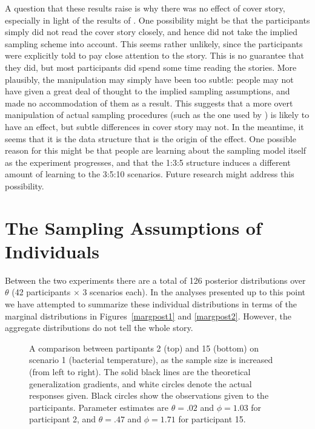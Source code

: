 \documentclass[doc]{apa6}
\begin{document}
A question that these results raise is why there was no effect of cover story, especially in light of the results of . One possibility might be that the participants simply did not read the cover story closely, and hence did not take the implied sampling scheme into account. This seems rather unlikely, since the participants were explicitly told to pay close attention to the story. This is no guarantee that they did, but most participants did spend some time reading the stories. More plausibly, the manipulation may simply have been too subtle: people may not have given a great deal of thought to the implied sampling assumptions, and made no accommodation of them as a result. This suggests that a more overt manipulation of actual sampling procedures (such as the one used by ) is likely to have an effect, but subtle differences in cover story may not. In the meantime, it seems that it is the data structure that is the origin of the effect. One possible reason for this might be that people are learning about the sampling model itself as the experiment progresses, and that the 1:3:5 structure induces a different amount of learning to the 3:5:10 scenarios. Future research might address this possibility.








\section{The Sampling Assumptions of Individuals}



Between the two experiments there are a total of 126 posterior distributions over $\theta$ (42 participants $\times$ 3 scenarios each). In the analyses presented up to this point we have attempted to summarize these individual distributions in terms of the marginal distributions in Figures~\ref{margpost1} and \ref{margpost2}. However, the aggregate distributions do not tell the whole story.

\begin{figure}[t]
\begin{center}
\caption{A comparison between partipants 2 (top) and 15 (bottom) on scenario 1 (bacterial temperature), as the sample size is increased (from left to right). The solid black lines are the theoretical generalization gradients, and white circles denote the actual responses given. Black circles show the observations given to the participants. Parameter estimates are $\theta = .02$ and $\phi = 1.03$ for participant 2, and $\theta = .47$ and $\phi = 1.71$ for participant 15.}
\label{comp1}
\end{center}
\end{figure}
\end{document}
